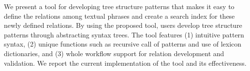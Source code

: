 We present a tool for developing tree structure patterns that makes it easy to define the relations among textual phrases and create a search index for these newly defined relations. By using the proposed tool, users develop tree structure patterns through abstracting syntax trees. The tool features (1) intuitive pattern syntax, (2) unique functions such as recursive call of patterns and use of lexicon dictionaries, and (3) whole workflow support for relation development and validation. We report the current implementation of the tool and its effectiveness.
